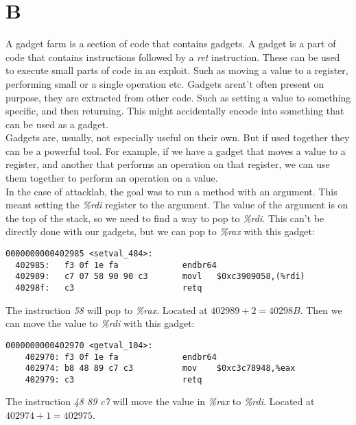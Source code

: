 \documentclass[11pt]{report}
\begin{document}
\section{B}
A gadget farm is a section of code that contains gadgets. A gadget is a part of code that contains instructions followed by a \textit{ret} instruction. These can be used to execute small parts of code in an exploit. Such as moving a value to a register, performing small or a single operation etc. Gadgets arent't often present on purpose, they are extracted from other code. Such as setting a value to something specific,  and then returning. This might accidentally encode into something that can be used as a gadget.\\

Gadgets are, usually, not especially useful on their own. But if used together they can be a powerful tool. For example, if we have a gadget that moves a value to a register, and another that performs an operation on that register, we can use them together to perform an operation on a value.\\[1ex]

In the case of attacklab, the goal was to run a method with an argument. This meant setting the \textit{\%rdi} register to the argument. The value of the argument is on the top of the stack, so we need to find a way to pop to \textit{\%rdi}. This can't be directly done with our gadgets, but we can pop to \textit{\%rax} with this gadget:
\begin{lstlisting}[language={[x86masm]Assembler}]
0000000000402985 <setval_484>:
  402985:	f3 0f 1e fa          	endbr64 
  402989:	c7 07 58 90 90 c3    	movl   $0xc3909058,(%rdi)
  40298f:	c3                   	retq   
\end{lstlisting}
The instruction \textit{58} will pop to \textit{\%rax}. Located at $402989 + 2 = 40298B$. Then we can move the value to \textit{\%rdi} with this gadget:
\begin{lstlisting}[language={[x86masm]Assembler}]
0000000000402970 <getval_104>:
    402970:	f3 0f 1e fa          	endbr64 
    402974:	b8 48 89 c7 c3       	mov    $0xc3c78948,%eax
    402979:	c3                   	retq   
\end{lstlisting}
The instruction \textit{48 89 c7} will move the value in \textit{\%rax} to \textit{\%rdi}. Located at $402974 + 1 = 402975$.\\[1ex] 
\end{document}
